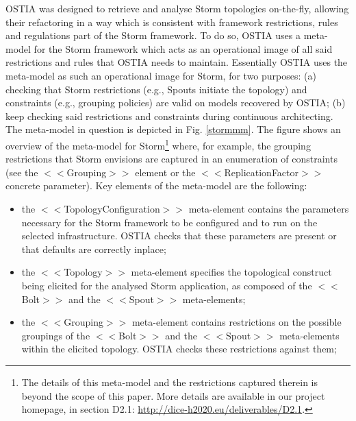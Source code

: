 OSTIA was designed to retrieve and analyse Storm topologies on-the-fly, allowing their refactoring in a way which is consistent with framework restrictions, rules and regulations part of the Storm framework. To do so, OSTIA uses a meta-model for the Storm framework which acts as an operational image of all said restrictions and rules that OSTIA needs to maintain. 
Essentially OSTIA uses the meta-model as such an operational image for Storm, for two purposes: (a) checking that Storm restrictions (e.g., Spouts initiate the topology) and constraints (e.g., grouping policies) are valid on models recovered by OSTIA; (b) keep checking said restrictions and constraints during continuous architecting. 
The meta-model in question is depicted in Fig. \ref{stormmm}. The figure shows an overview of the meta-model for Storm\footnote{The details of this meta-model and the restrictions captured therein is beyond the scope of this paper. More details are available in our project homepage, in section D2.1: \url{http://dice-h2020.eu/deliverables/D2.1}.} where, for example, the grouping restrictions that Storm envisions are captured in an enumeration of constraints (see the $<<$Grouping$>>$ element or the $<<$ReplicationFactor$>>$ concrete parameter). Key elements of the meta-model are the following:
\begin{itemize}
\item the $<<$TopologyConfiguration$>>$ meta-element contains the parameters necessary for the Storm framework to be configured and to run on the selected infrastructure. OSTIA checks that these parameters are present or that defaults are correctly inplace;
\item the $<<$Topology$>>$ meta-element specifies the topological construct being elicited for the analysed Storm application, as composed of the $<<$Bolt$>>$ and  the $<<$Spout$>>$ meta-elements;
\item  the $<<$Grouping$>>$ meta-element contains restrictions on the possible groupings of the $<<$Bolt$>>$ and the $<<$Spout$>>$ meta-elements within the elicited topology. OSTIA checks these restrictions against them;
\end{itemize}

